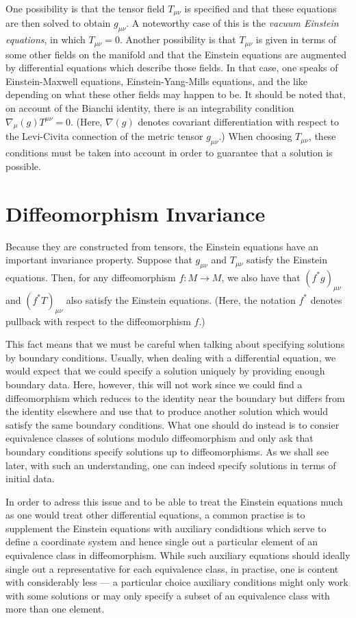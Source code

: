 \documentclass[12pt]{article}
\begin{document}
One possibility is that the tensor field $T_{\mu \nu}$ is specified and that
these equations are then solved to obtain $g_{\mu \nu}$.  A noteworthy case of 
this is the \emph{vacuum Einstein equations}, in which $T_{\mu \nu} = 0$.
Another possibility is that $T_{\mu \nu}$ is given in terms of some other
fields on the manifold and that the Einstein equations are augmented by
differential equations which describe those fields.  In that case, one speaks
of Einstein-Maxwell equations, Einstein-Yang-Mills equations, and the like
depending on what these other fields may happen to be.  It should be noted 
that, on account of the Bianchi identity, there is an integrability condition
$\nabla_\mu (g) T^{\mu \nu} = 0$.  (Here, $\nabla (g)$ denotes covariant
differentiation with respect to the Levi-Civita connection of the metric
tensor $g_{\mu \nu}$.)  When choosing $T_{\mu \nu}$, these conditions must
be taken into account in order to guarantee that a solution is possible.

\section{Diffeomorphism Invariance}

Because they are constructed from tensors, the Einstein equations have an
important invariance property.  Suppose that $g_{\mu \nu}$ and $T_{\mu \nu}$ satisfy the Einstein equations.  Then, for any diffeomorphism $f \colon M \to
M$, we also have that $(f^* g)_{\mu \nu}$ and $(f^* T)_{\mu \nu}$ also 
satisfy the Einstein equations.  (Here, the notation $f^*$ denotes pullback 
with respect to the diffeomorphism $f$.)

This fact means that we must be careful when talking about specifying solutions
by boundary conditions.  Usually, when dealing with a differential equation,
we would expect that we could specify a solution uniquely by providing enough
boundary data.  Here, however, this will not work since we could find a
diffeomorphism which reduces to the identity near the boundary but differs
from the identity elsewhere and use that to produce another solution which 
would satisfy the same boundary conditions.  What one should do instead is to
consier equivalence classes of solutions modulo diffeomorphism and only
ask that boundary conditions specify solutions up to diffeomorphisms.  As we
shall see later, with such an understanding, one can indeed specify solutions 
in terms of initial data.

In order to adress this issue and to be able to treat the Einstein equations
much as one would treat other differential equations, a common practise is to
supplement the Einstein equations with auxiliary condidtions which serve to
define a coordinate system and hence single out a particular element of an
equivalence class in diffeomorphism.  While such auxiliary equations should
ideally single out a representative for each equivalence class, in practise,
one is content with considerably less --- a particular choice auxiliary 
conditions might only work with some solutions or may only specify a 
subset of an equivalence class with more than one element. 
\end{document}
